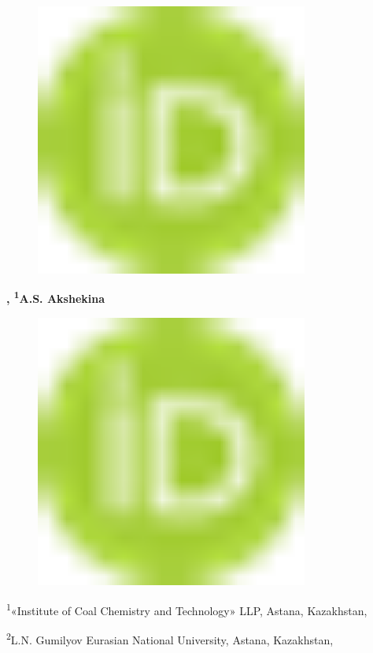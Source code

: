 \begin{figure}[H]
	\centering
	\includegraphics[width=0.8\textwidth]{media/chem2/image1}
	\caption*{}
\end{figure}
{\bfseries ,
\textsuperscript{1}A.S.
Akshekina}
\begin{figure}[H]
	\centering
	\includegraphics[width=0.8\textwidth]{media/chem2/image1}
	\caption*{}
\end{figure}


\textsuperscript{1}«Institute of Coal Chemistry and Technology» LLP,
Astana, Kazakhstan,

\textsuperscript{2}L.N. Gumilyov Eurasian National University,
Astana, Kazakhstan,

